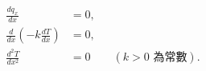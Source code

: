\begin{align*}
\frac{dq_x}{dx}&=0,\\
\frac{d}{dx}\left(-k\frac{dT}{dx}\right)&=0,\\
\frac{d^2T}{dx^2}&=0 \qquad (k>0\text{ 為常數}).
\end{align*}